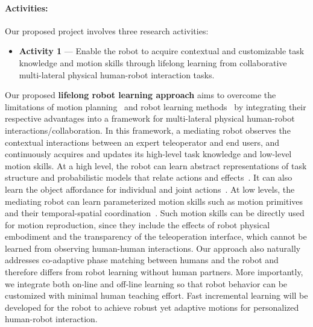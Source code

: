 \documentclass[letterpaper, 11 pt, onecolumn]{article}
\begin{document}
\paragraph*{Activities:} Our proposed project involves three research activities: 
\begin{itemize}
\item \textbf{Activity 1} --- Enable the robot to acquire contextual and customizable task knowledge and motion skills through lifelong learning from collaborative multi-lateral physical human-robot interaction tasks. 
\end{itemize}
\noindent
Our proposed \textbf{lifelong robot learning approach} aims to overcome the limitations of motion planning~\cite{HandbookOfRobotics_motionplanning} and robot learning methods~\cite{HandbookOfRobotics_learningfromhuman,HandbookOfRobotics_robotlearning} by integrating their respective advantages into a framework for multi-lateral physical human-robot interactions/collaboration. In this framework, a mediating robot observes the contextual interactions between an expert teleoperator and end users, and continuously acquires and updates its high-level task knowledge and low-level motion skills. At a high level, the robot can learn abstract representations of task structure and probabilistic models that relate actions and effects~\cite{konidaris2018skills}. It can also learn the object affordance for individual and joint actions~\cite{konidaris2012robot,niekum2013semantically,knoblich2011psychological}. At low levels, the mediating robot can learn parameterized motion skills such as motion primitives and their temporal-spatial coordination~\cite{ijspeert2013dynamical,calinon2010learning,meier2016probabilistic,maeda2017phase}. Such motion skills can be directly used for motion reproduction, since they include the effects of robot physical embodiment and the transparency of the teleoperation interface, which cannot be learned from observing human-human interactions. Our approach also naturally addresses co-adaptive phase matching between humans and the robot and therefore differs from robot learning without human partners. More importantly, we integrate both on-line and off-line learning so that robot behavior can be customized with minimal human teaching effort. Fast incremental learning will be developed for the robot to achieve robust yet adaptive motions for personalized human-robot interaction.
\end{document}
